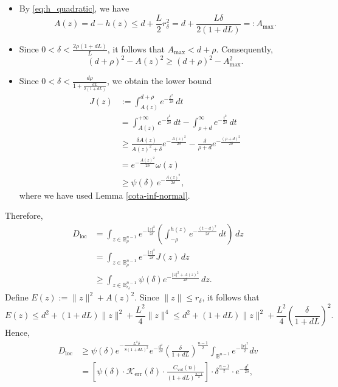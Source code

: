 \documentclass[11pt]{amsart}
\newcommand{\1}{\mathds{1}}
\theoremstyle{definition}
\theoremstyle{remark}
\theoremstyle{definition}
\begin{document}
\begin{itemize}
  \item By \eqref{eq:h_quadratic}, we have
  \[
  A(z)=d-h(z)\le d+\frac{L}{2}r_{\delta}^2
  =d+\frac{L\delta}{2(1+dL)}=:A_{\max}.
  \]
  \item Since \(0<\delta<\frac{2\rho(1+dL)}{L}\), it follows that \(A_{\max}<d+\rho\). Consequently,
  \[
  (d+\rho)^2-A(z)^2\ge (d+\rho)^2-A_{\max}^2.
  \]
  \item Since \(0<\delta<\frac{d\rho}{1+\frac{dL}{2(1+dL)}}\), we obtain the lower bound
  \begin{equation*}
      \begin{aligned}
          J(z)&:=\int_{A(z)}^{d+\rho} e^{-\frac{t^2}{2\delta}}\,dt\\
          &=\int_{A(z)}^{+\infty} e^{-\frac{t^2}{2\delta}}\,dt-\int_{\rho+d}^{\infty} e^{-\frac{t^2}{2\delta}}\,dt\\
          &\geq \frac{\delta A(z)}{A(z)^2+\delta}e^{-\frac{A(z)^2}{2\delta}}-\frac{\delta}{\rho+d}e^{-\frac{(\rho+d)^2}{2\delta}}\\
          &=e^{-\frac{A(z)^2}{2\delta}} \omega(z)\\
  &\geq \psi(\delta)\,e^{-\frac{A(z)^2}{2\delta}},
      \end{aligned}
  \end{equation*}
  where we have used Lemma \ref{cota-inf-normal}.
\end{itemize}
Therefore,
\begin{equation*}
    \begin{aligned}
        D_{\operatorname{loc}}&=\int_{z\in \mathbb{B}_{\rho}^{n-1}}e^{-\frac{\Vert z\Vert^2}{2\delta}}\left(\int_{-\rho}^{h(z)}e^{-\frac{(t-d)^2}{2\delta}}\,dt\right)\,dz\\
        &=\int_{z\in \mathbb{B}_{\rho}^{n-1}}e^{-\frac{\Vert z\Vert^2}{2\delta}}J(z)\,dz\\
        &\geq \int_{z\in \mathbb{B}_{r_{\delta}}^{n-1}} \psi(\delta)e^{-\frac{\Vert z\Vert^2+A(z)^2}{2\delta}}\,dz.
    \end{aligned}
\end{equation*}
Define \(E(z):=\|z\|^2 + A(z)^2\). Since \(\|z\|\le r_{\delta}\), it follows that
\[
E(z)\le d^2 + (1+dL)\|z\|^2 + \frac{L^2}{4}\|z\|^4
\le d^2 + (1+dL)\|z\|^2 + \frac{L^2}{4}\left(\frac{\delta}{1+dL}\right)^2.
\]
Hence,
\begin{equation*}
    \begin{aligned}
        D_{\operatorname{loc}}&\geq \psi(\delta)e^{-\frac{L^2\delta }{8 (1+dL)^2}} e^{-\frac{d^2}{2\delta}} \left(\frac{\delta}{1+dL}\right)^{\frac{n-1}{2}}\int_{\mathbb{B}^{n-1}}e^{-\frac{\Vert v\Vert^2}{2}}dv\\
        &=\left[\psi(\delta) \cdot \mathcal{K}_{\operatorname{err}}(\delta)\cdot \frac{C_{\operatorname{vol}}(n)}{(1+dL)^{\frac{n-1}{2}}} \right]\cdot \delta^{\frac{n-1}{2}}\cdot e^{-\frac{d^2}{2\delta}},
    \end{aligned}
\end{equation*}
\end{document}
